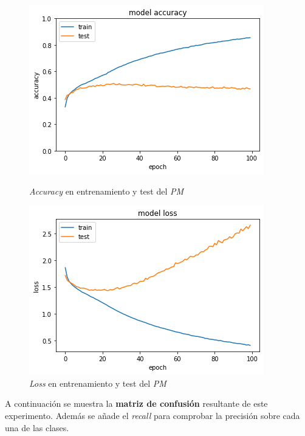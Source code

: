 \documentclass{uc3mpracticas}
\begin{document}
\begin{figure}[!h]
\centering
\begin{minipage}{.52\textwidth}
  \centering
  \includegraphics[width=.8\linewidth]{Images/accuracyPM-100.png}
  \caption*{\textit{Accuracy} en entrenamiento y test del \textit{PM}}
\end{minipage}%
\begin{minipage}{.52\textwidth}
  \centering
  \includegraphics[width=.8\linewidth]{Images/lossPM-100.png}
  \caption*{\textit{Loss} en entrenamiento y test del \textit{PM}}
\end{minipage}
\end{figure}



A continuación se muestra la \textbf{matriz de confusión} resultante de este experimento. Además se añade el \textit{recall} para comprobar la precisión sobre cada una de las clases.
\end{document}
